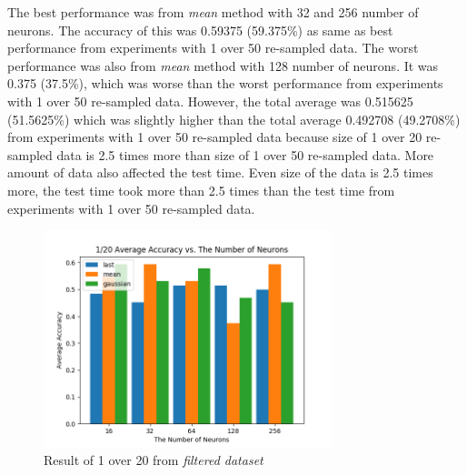 \documentclass[draft,dvipsnames]{drexel-thesis}
\begin{document}
\begin{thesis}
The best performance was from {\em mean} method with 32 and 256 number of neurons. The accuracy of this was 0.59375 (59.375\%) as same as best performance from experiments with 1 over 50 re-sampled data. The worst performance was also from {\em mean} method with 128 number of neurons. It was 0.375 (37.5\%), which was worse than the worst performance from experiments with 1 over 50 re-sampled data. However, the total average was 0.515625 (51.5625\%) which was slightly higher than the total average 0.492708 (49.2708\%) from experiments with 1 over 50 re-sampled data because size of 1 over 20 re-sampled data is 2.5 times more than size of 1 over 50 re-sampled data. More amount of data also affected the test time. Even size of the data is 2.5 times more, the test time took more than 2.5 times than the test time from experiments with 1 over 50 re-sampled data.

\begin{figure}[t!]
    \centering
    \includegraphics[width=0.75\textwidth]{pictures/result_pictures/filtered_1_20_result.png}
    \caption{Result of 1 over 20 from {\em filtered dataset}}
    \label{fig:filter_1_20}
\end{figure}


\end{thesis}
\end{document}
